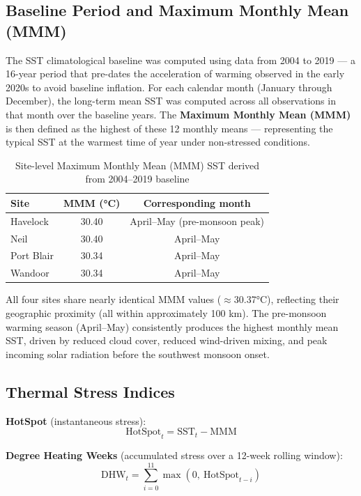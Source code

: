 \documentclass[12pt,a4paper]{report}
\begin{document}
\subsection{Baseline Period and Maximum Monthly Mean (MMM)}

The SST climatological baseline was computed using data from 2004 to 2019 — a
16-year period that pre-dates the acceleration of warming observed in the early
2020s to avoid baseline inflation. For each calendar month (January through December),
the long-term mean SST was computed across all observations in that month over the
baseline years. The \textbf{Maximum Monthly Mean (MMM)} is then defined as the
highest of these 12 monthly means — representing the typical SST at the warmest
time of year under non-stressed conditions.

\begin{table}[H]
\centering
\caption{Site-level Maximum Monthly Mean (MMM) SST derived from 2004--2019 baseline}
\begin{tabular}{lcc}
\toprule
\textbf{Site} & \textbf{MMM (°C)} & \textbf{Corresponding month} \\
\midrule
\rowcolor{rowgray}
Havelock    & 30.40 & April--May (pre-monsoon peak) \\
Neil        & 30.40 & April--May \\
\rowcolor{rowgray}
Port Blair  & 30.34 & April--May \\
Wandoor     & 30.34 & April--May \\
\bottomrule
\end{tabular}
\label{tab:mmm}
\end{table}

All four sites share nearly identical MMM values ($\approx$30.37°C), reflecting their
geographic proximity (all within approximately 100 km). The pre-monsoon warming
season (April--May) consistently produces the highest monthly mean SST, driven by
reduced cloud cover, reduced wind-driven mixing, and peak incoming solar radiation
before the southwest monsoon onset.

\subsection{Thermal Stress Indices}

\textbf{HotSpot} (instantaneous stress):
\[ \text{HotSpot}_t = \text{SST}_t - \text{MMM} \]

\textbf{Degree Heating Weeks} (accumulated stress over a 12-week rolling window):
\[ \text{DHW}_t = \sum_{i=0}^{11} \max(0,\ \text{HotSpot}_{t-i}) \]
\end{document}
